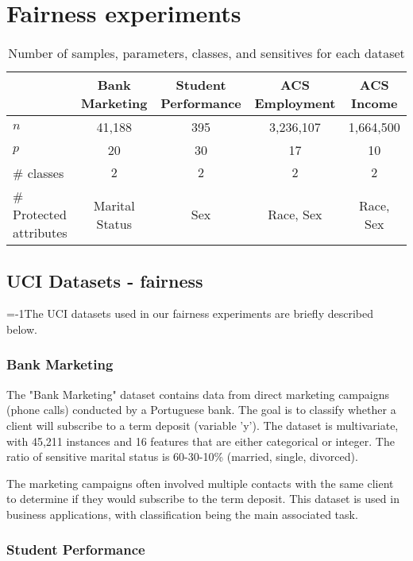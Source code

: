 \newpage

\section{Fairness experiments}
\label{appx:sec_F}


\begin{table}[t]
\small
\centering
\begin{tabular}{l|cccc}
 & Bank Marketing  & Student Performance & ACS Employment & ACS Income \\ \toprule
 $n$ &  41,188 & 395  & 3,236,107 & 1,664,500  \\ 
 $p$ & 20  & 30  & 17 & 10  \\ 
 \# classes & $2$ & $2$ & $2$ & $2$  \\
 \# Protected attributes & Marital Status & Sex & Race, Sex & Race, Sex \\\bottomrule
\end{tabular}
\caption{Number of samples, parameters, classes, and sensitives for each dataset}
\label{tab:num_tasks_samples_fairness}
\end{table}


\subsection{UCI Datasets - fairness}

\looseness=-1The UCI datasets \citep{uci2019} used in our fairness experiments are briefly described below. 

\subsubsection{Bank Marketing}

The "Bank Marketing" dataset \citep{moro2014bankmarketing} contains data from direct marketing campaigns (phone calls) conducted by a Portuguese bank. The goal is to classify whether a client will subscribe to a term deposit (variable 'y'). The dataset is multivariate, with 45,211 instances and 16 features that are either categorical or integer. The ratio of sensitive marital status is 60-30-10\% (married, single, divorced).

The marketing campaigns often involved multiple contacts with the same client to determine if they would subscribe to the term deposit. This dataset is used in business applications, with classification being the main associated task.

\subsubsection{Student Performance}


